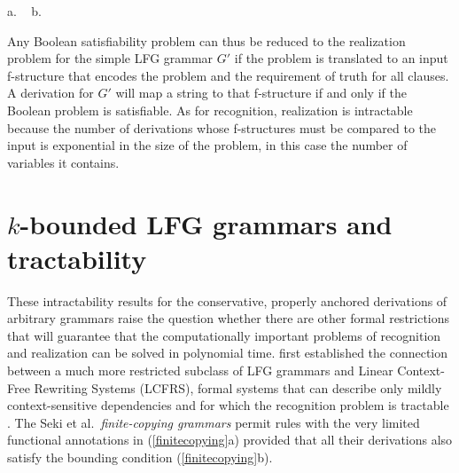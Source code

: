\documentclass[output=paper,hidelinks]{langscibook}
\begin{document}
\ea\label{badfs}
\!\!\!a. \  
\hsp{1.5em}
b. \          
\z

 Any Boolean satisfiability problem can thus be reduced to the realization problem for the simple LFG grammar $G'$ if the problem is translated to an input f-structure that encodes the problem and the requirement of truth for all clauses.  A derivation for $G'$ will map a string to that f-structure if and only if the Boolean problem is satisfiable.  As for recognition, realization is intractable because the number of derivations whose f-structures must be compared to the input is exponential in the size of the problem, in this case the number of variables it contains.



\section{$k$-bounded LFG grammars and tractability }\label{Tractable}

These intractability results for the conservative, properly anchored derivations of arbitrary grammars raise the question whether there are other formal restrictions that will guarantee that the computationally important problems of recognition and realization can be solved in polynomial time. \cite{SekiEtAl1993} first established the connection between a much more restricted subclass of LFG grammars and Linear Context-Free Rewriting Systems (LCFRS), formal systems that can describe only mildly context-sensitive dependencies and for which the recognition problem is tractable \citep{Kallmeyer2010b}.   The Seki et al.\ \emph{finite-copying grammars} permit rules with the very limited functional annotations in (\ref{finitecopying}a) provided that all their derivations also satisfy the bounding condition (\ref{finitecopying}b).
\end{document}
